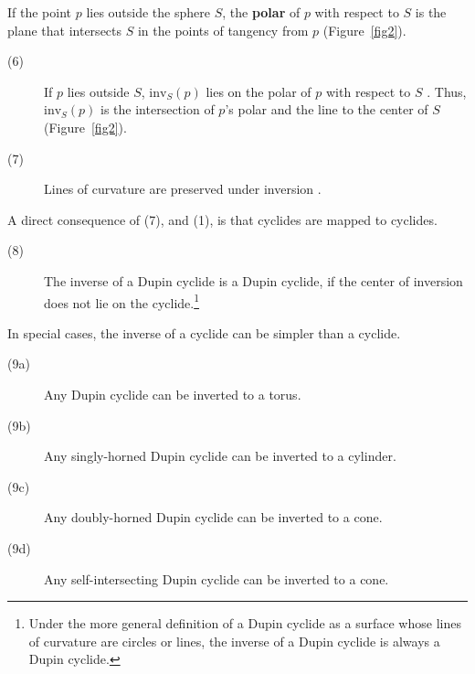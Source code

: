 \begin{defn2}
If the point $p$ lies outside the sphere $S$,
the {\bf polar} of $p$ with respect to $S$
is the plane that intersects $S$ in the points of tangency from $p$ 
(Figure~\ref{fig2}).
\end{defn2}

\begin{description}
\item[(6)]
\label{prop:polar}
If $p$ lies outside $S$, $\mbox{inv}_{S}(p)$ 
lies on the polar of $p$ with respect to $S$ \cite{Coo71}.
Thus, $\mbox{inv}_{S}(p)$ is the intersection of $p$'s polar
and the line to the center of $S$ (Figure~\ref{fig2}).
\end{description}


\begin{description}
\item[(7)]
Lines of curvature are preserved under inversion \cite{FISCH86}. %
\end{description}


A direct consequence of (7), and (1), is that cyclides are mapped to cyclides.

\begin{description}
\item[(8)]
The inverse of a Dupin cyclide is a Dupin cyclide,
if the center of inversion does not lie on the cyclide.\footnote{Under the
	more general definition of a Dupin cyclide as a surface whose lines
	of curvature are circles or lines,
	the inverse of a Dupin cyclide is always a Dupin cyclide.}
\end{description}

In special cases, the inverse of a cyclide can be simpler than a cyclide.

\begin{description}
\item[(9a)] Any Dupin cyclide can be inverted to a torus.
\item[(9b)] Any singly-horned Dupin cyclide can be inverted to a cylinder.
\item[(9c)] Any doubly-horned Dupin cyclide can be inverted to a cone.
\item[(9d)] Any self-intersecting Dupin cyclide can be inverted to a cone.
\end{description}

